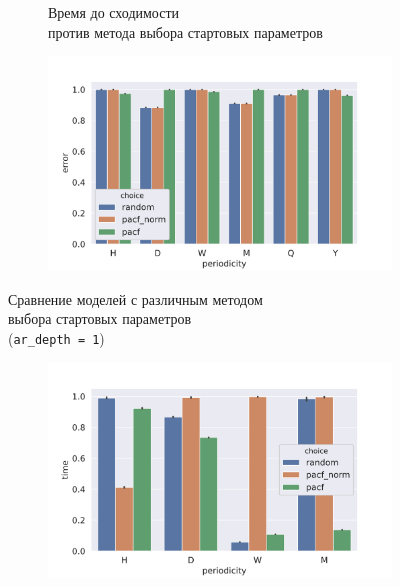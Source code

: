 \documentclass[a4paper,14pt]{extarticle}
\begin{document}
\begin{enumerate}
\begin{figure}[!h]
\begin{subfigure}[b]{.5\linewidth}
				\caption{Время до сходимости \\ против метода выбора стартовых параметров}
				\label{hyper:starting_params_1:time}
			\end{subfigure}%
			\begin{subfigure}[b]{.5\linewidth}
				\centering
				\includegraphics[width=\linewidth]{pictures/hyper-starting_params-mse.pdf}
				\label{hyper:starting_params_1:mse}
			\end{subfigure}
			\caption{Сравнение моделей с различным методом \\ выбора стартовых параметров \\ (\texttt{ar\_depth = 1})}
			\label{hyper:starting_params_1}
		\end{figure}
		\begin{figure}[!h]
			\captionsetup{justification=centering}
			\begin{subfigure}[b]{.5\linewidth}
				\centering
				\includegraphics[width=\linewidth]{pictures/hyper-starting_params_normalized-time.pdf}

\end{subfigure}
\end{figure}
\end{enumerate}
\end{document}
